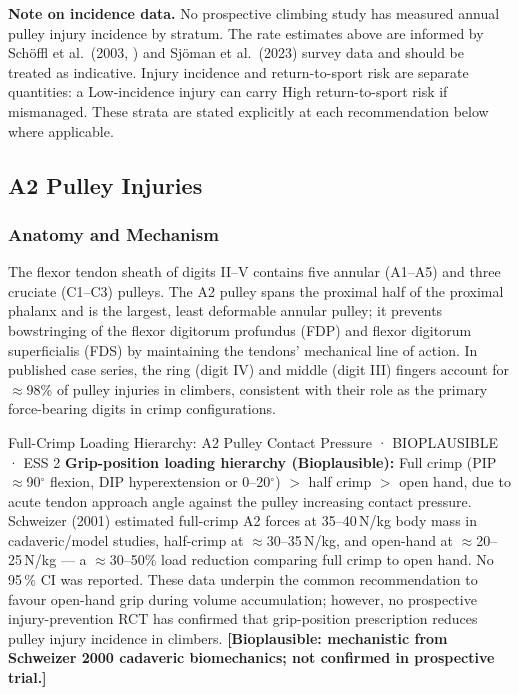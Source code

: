 \noindent\textbf{Note on incidence data.} No prospective climbing study has measured annual pulley injury incidence by stratum. The rate estimates above are informed by Sch\"{o}ffl et al.\ (2003, \cite{SHWS03}) and Sjöman et al.\ (2023) survey data and should be treated as indicative. Injury incidence and return-to-sport risk are separate quantities: a Low-incidence injury can carry High return-to-sport risk if mismanaged. These strata are stated explicitly at each recommendation below where applicable.

\subsection{A2 Pulley Injuries}
\label{subsec:a2pulley}

\subsubsection{Anatomy and Mechanism}

The flexor tendon sheath of digits II--V contains five annular (A1--A5) and three cruciate (C1--C3) pulleys. The A2 pulley spans the proximal half of the proximal phalanx and is the largest, least deformable annular pulley; it prevents bowstringing of the flexor digitorum profundus (FDP) and flexor digitorum superficialis (FDS) by maintaining the tendons' mechanical line of action. In published case series, the ring (digit IV) and middle (digit III) fingers account for $\approx$98\% of pulley injuries in climbers, consistent with their role as the primary force-bearing digits in crimp configurations.

\begin{bioplausbox}{Full-Crimp Loading Hierarchy: A2 Pulley Contact Pressure · BIOPLAUSIBLE · ESS 2}
\textbf{Grip-position loading hierarchy (Bioplausible):} Full crimp (PIP $\approx$90$^\circ$ flexion, DIP hyperextension or 0--20$^\circ$) $>$ half crimp $>$ open hand, due to acute tendon approach angle against the pulley increasing contact pressure. Schweizer (2001) estimated full-crimp A2 forces at 35--40\,N/kg body mass in cadaveric/model studies, half-crimp at $\approx$30--35\,N/kg, and open-hand at $\approx$20--25\,N/kg --- a $\approx$30--50\% load reduction comparing full crimp to open hand. No 95\,\% CI was reported. These data underpin the common recommendation to favour open-hand grip during volume accumulation; however, no prospective injury-prevention RCT has confirmed that grip-position prescription reduces pulley injury incidence in climbers. \textbf{[Bioplausible: mechanistic from Schweizer 2000 cadaveric biomechanics; not confirmed in prospective trial.]}
\end{bioplausbox}

